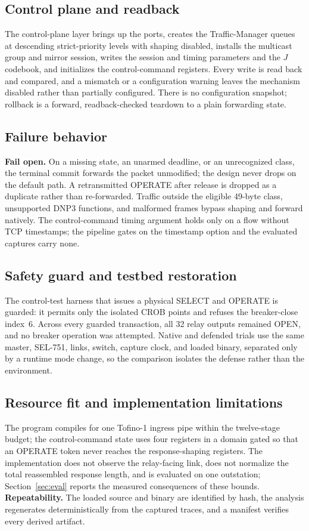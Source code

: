 \subsection{Control plane and readback}
The control-plane layer brings up the ports, creates the Traffic-Manager queues at descending
strict-priority levels with shaping disabled, installs the multicast group and mirror session, writes
the session and timing parameters and the $J$ codebook, and initializes the control-command registers. Every write
is read back and compared, and a mismatch or a configuration warning leaves the mechanism disabled
rather than partially configured. There is no configuration snapshot; rollback is a forward,
readback-checked teardown to a plain forwarding state.

\subsection{Failure behavior}
\textbf{Fail open.} On a missing state, an unarmed deadline, or an unrecognized class, the terminal
commit forwards the packet unmodified; the design never drops on the default path. A retransmitted
OPERATE after release is dropped as a duplicate rather than re-forwarded. Traffic outside the eligible
49-byte class, unsupported DNP3 functions, and malformed frames bypass shaping and forward natively.
The control-command timing argument holds only on a flow without TCP timestamps; the pipeline gates on the
timestamp option and the evaluated captures carry none.

\subsection{Safety guard and testbed restoration}
The control-test harness that issues a physical SELECT and OPERATE is guarded: it permits only the
isolated CROB points  and refuses the breaker-close index~6. Across every guarded
transaction, all 32 relay outputs remained OPEN, and no breaker operation was attempted. Native and
defended trials use the same master, SEL-751, links, switch, capture clock, and loaded binary,
separated only by a runtime mode change, so the comparison isolates the defense rather than the
environment.

\subsection{Resource fit and implementation limitations}
The program compiles for one Tofino-1 ingress pipe within the twelve-stage budget; the control-command state uses
four registers in a domain gated so that an OPERATE token never reaches the response-shaping registers. The
implementation does not observe the relay-facing link, does not normalize the total reassembled
response length, and is evaluated on one outstation; Section~\ref{sec:eval} reports the measured
consequences of these bounds. \textbf{Repeatability.} The loaded source and binary are identified by
hash, the analysis regenerates deterministically from the captured traces, and a manifest verifies
every derived artifact.

